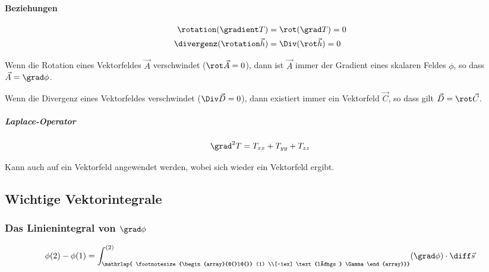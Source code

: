 			\paragraph{Beziehungen} %
				\begin{align*}
					\rotation(\gradient T) &= \rot (\grad T) = 0 \\
					\divergenz(\rotation \vec{h}) &= \Div (\rot \vec{h}) = 0
				\end{align*}
				
				\begin{theorem}
					Wenn die Rotation eines Vektorfeldes $\vec{A}$ verschwindet ($\rot \vec{A} = 0$), dann ist $\vec{A}$ immer der Gradient eines skalaren Feldes $\phi$, so dass $\vec{A} = \grad \phi$.
				\end{theorem}
				
				\begin{theorem}
					Wenn die Divergenz eines Vektorfeldes verschwindet ($\Div \vec{D} = 0$), dann existiert immer ein Vektorfeld $\vec{C}$, so dass gilt $\vec{D} = \rot \vec{C}$.
				\end{theorem}
				
				\subparagraph{Laplace-Operator} %
					
					\[
						\grad^2 T = T_{xx} + T_{yy} + T_{zz}
					\]
					
					Kann auch auf ein Vektorfeld angewendet werden, wobei sich wieder ein Vektorfeld ergibt.
					
			
		
	
	\subsection{Wichtige Vektorintegrale} %
		
		\subsubsection{Das Linienintegral von $\grad \phi$} %
			
			\[
				\phi(2) - \phi(1) = \int_{\mathrlap{
					\footnotesize{\begin{array}{@{}l@{}}
						(1) \\[-1ex]
						\text{längs } \Gamma
					\end{array}}}
				}^{(2)} (\grad \phi) \cdot \diff \vec{s}
			\]
			
